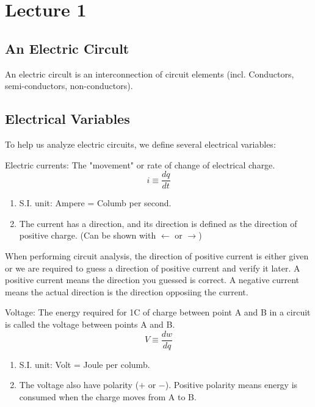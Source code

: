 \documentclass{article}
\begin{document}
\section{Lecture 1}
\subsection{An Electric Circult}
    An electric circult is an interconnection of circuit elements (incl. Conductors, semi-conductors, non-conductors). 

\subsection{Electrical Variables}
    To help us analyze electric circuits, we define several electrical variables:
    \begin{definition}
        Electric currents: The "movement" or rate of change of electrical charge. 
        \begin{equation}
            i\equiv\frac{dq}{dt}
        \end{equation} 
        
        \begin{enumerate}
            \item S.I. unit: Ampere = Columb per second.
            \item The current has a direction, and its direction is defined as the direction of positive charge. (Can be shown with $\leftarrow$ or $\rightarrow$)
        \end{enumerate}
    \end{definition}
    When performing circuit analysis, the direction of positive current is either given or we are required to guess a direction of positive current and verify it later. A positive current means the direction you guessed is correct. A negative current means the actual direction is the direction opposiing the current.
    \begin{definition}
        Voltage: The energy required for 1C of charge between point A and B in a circuit is called the voltage between points A and B. 
        \begin{equation}
            V\equiv\frac{dw}{dq}
        \end{equation} 
        \begin{enumerate}
            \item S.I. unit: Volt = Joule per columb.
            \item The voltage also have polarity ($+$ or $-$). Positive polarity means energy is consumed when the charge moves from A to B.
        \end{enumerate}
    \end{definition}
\end{document}
